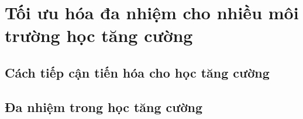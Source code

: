 \chapter{Tối ưu hóa đa nhiệm cho nhiều môi trường học tăng cường}
\label{chap:propose}

\section{Cách tiếp cận tiến hóa cho học tăng cường}

\newpage
\section{Đa nhiệm trong học tăng cường}

\newpage